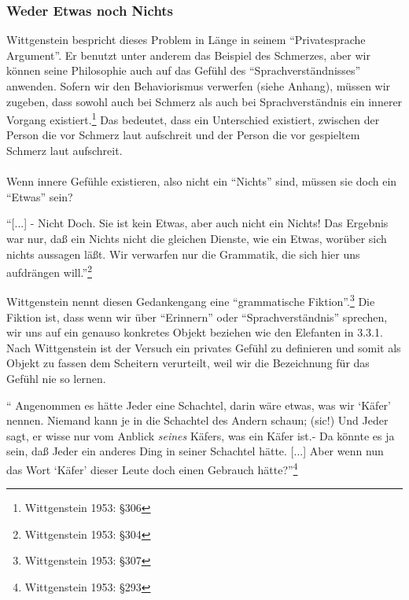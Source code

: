 \documentclass[10pt,a4paper]{article}
\begin{document}
\subsubsection{Weder Etwas noch Nichts}
Wittgenstein bespricht dieses Problem in Länge in seinem \enquote{Privatesprache Argument}. Er benutzt unter anderem das Beispiel des Schmerzes, aber wir können seine Philosophie auch auf das Gefühl des \enquote{Sprachverständnisses} anwenden. Sofern wir den Behaviorismus verwerfen (siehe Anhang), müssen wir zugeben, dass sowohl auch bei Schmerz als auch bei Sprachverständnis ein innerer Vorgang existiert.\footnote{Wittgenstein 1953: §306} Das bedeutet, dass ein Unterschied existiert, zwischen der Person die vor Schmerz laut aufschreit und der Person die vor gespieltem Schmerz laut aufschreit. \\
\\
Wenn innere Gefühle existieren, also nicht ein \enquote{Nichts} sind, müssen sie doch ein \enquote{Etwas} sein?

\begin{displayquote}
\enquote{[...] - Nicht Doch. Sie ist kein Etwas, aber auch nicht ein Nichts! Das Ergebnis war nur, daß ein Nichts nicht die gleichen Dienste, wie ein Etwas, worüber sich nichts aussagen läßt. Wir verwarfen nur die Grammatik, die sich hier uns aufdrängen will.}\footnote{Wittgenstein 1953: §304} %
\end{displayquote}
Wittgenstein nennt diesen Gedankengang eine \enquote{grammatische Fiktion}.\footnote{Wittgenstein 1953: §307} Die Fiktion ist, dass wenn wir über \enquote{Erinnern} oder \enquote{Sprachverständnis} sprechen, wir uns auf ein genauso konkretes Objekt beziehen wie den Elefanten in 3.3.1. Nach Wittgenstein ist der Versuch ein privates Gefühl zu definieren und somit als Objekt zu fassen dem Scheitern verurteilt, weil wir die Bezeichnung für das Gefühl nie so lernen.

\begin{displayquote}
\enquote{
Angenommen es hätte Jeder eine Schachtel, darin wäre etwas, was wir \enquote{Käfer} nennen. Niemand kann je in die Schachtel des Andern schaun; (sic!) Und Jeder sagt, er wisse nur vom Anblick \textit{seines} Käfers, was ein Käfer ist.- Da könnte es ja sein, daß Jeder ein anderes Ding in seiner Schachtel hätte. [...] Aber wenn nun das Wort \enquote{Käfer} dieser Leute doch einen Gebrauch hätte?}\footnote{Wittgenstein 1953: §293}
\end{displayquote}
\end{document}
